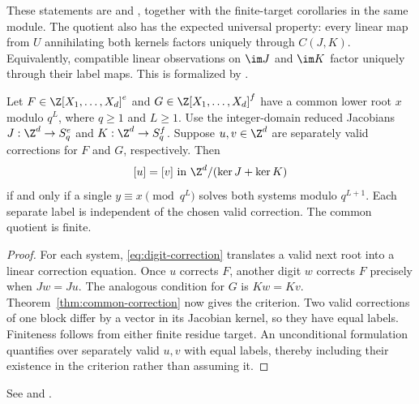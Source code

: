 These statements are
 and
, together with the
finite-target corollaries in the same module. The quotient also has the
expected universal property: every linear map from $U$ annihilating both
kernels factors uniquely through $C(J,K)$. Equivalently, compatible linear
observations on $\im J$ and $\im K$ factor uniquely through their label
maps. This is formalized by
.

\begin{corollary}\label{cor:shared-polynomial}
Let $F\in\Z[X_1,\ldots,X_d]^e$ and
$G\in\Z[X_1,\ldots,X_d]^f$ have a common lower root $x$ modulo $q^L$,
where $q\ge1$ and $L\ge1$. Use the integer-domain reduced Jacobians
$J:\Z^d\to S_q^e$ and $K:\Z^d\to S_q^f$. Suppose $u,v\in\Z^d$ are
separately valid corrections for $F$ and $G$, respectively. Then
\[
 [u]=[v]\text{ in }\Z^d/(\ker J+\ker K)
\]
if and only if a single $y\equiv x\pmod{q^L}$ solves both systems modulo
$q^{L+1}$. Each separate label is independent of the chosen valid
correction. The common quotient is finite.
\end{corollary}

\begin{proof}
For each system, \eqref{eq:digit-correction} translates a valid next root
into a linear correction equation. Once $u$ corrects $F$, another digit
$w$ corrects $F$ precisely when $Jw=Ju$. The analogous condition for $G$
is $Kw=Kv$. Theorem~\ref{thm:common-correction} now gives the criterion.
Two valid corrections of one block differ by a vector in its Jacobian
kernel, so they have equal labels. Finiteness follows from either finite
residue target. An unconditional formulation quantifies over separately
valid $u,v$ with equal labels, thereby including their existence in the
criterion rather than assuming it.
\end{proof}

See  and
.

